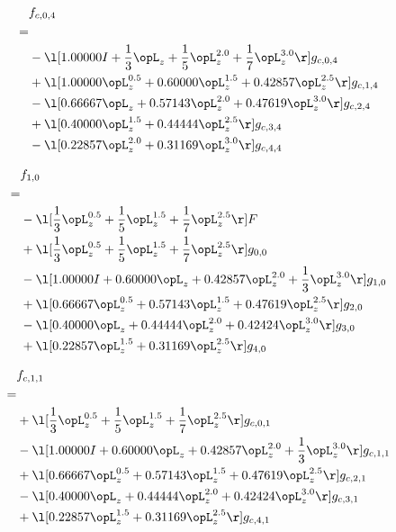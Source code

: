 \begin{alignat}{2} 
\label{eq:f_04_0} 
& f_{c,0,4} \nonumber \\ 
 = \\ 
& - \l[  1.00000 I + \frac{1}{3} \opL_z + \frac{1}{5} \opL_z^{2.0} + \frac{1}{7} \opL_z^{3.0}  \r] g_{c,0,4} \nonumber \\ 
& + \l[  1.00000 \opL_z^{0.5} +  0.60000 \opL_z^{1.5} +  0.42857 \opL_z^{2.5}  \r] g_{c,1,4} \nonumber \\ 
& - \l[  0.66667 \opL_z +  0.57143 \opL_z^{2.0} +  0.47619 \opL_z^{3.0}  \r] g_{c,2,4} \nonumber \\ 
& + \l[  0.40000 \opL_z^{1.5} +  0.44444 \opL_z^{2.5}  \r] g_{c,3,4} \nonumber \\ 
& - \l[  0.22857 \opL_z^{2.0} +  0.31169 \opL_z^{3.0}  \r] g_{c,4,4} \nonumber \\ 
\end{alignat} 


\begin{alignat}{2} 
\label{eq:f_10_0} 
& f_{1,0} \nonumber \\ 
 = \\ 
& - \l[ \frac{1}{3} \opL_z^{0.5} + \frac{1}{5} \opL_z^{1.5} + \frac{1}{7} \opL_z^{2.5}  \r] F \nonumber \\ 
& + \l[ \frac{1}{3} \opL_z^{0.5} + \frac{1}{5} \opL_z^{1.5} + \frac{1}{7} \opL_z^{2.5}  \r] g_{0,0} \nonumber \\ 
& - \l[  1.00000 I +  0.60000 \opL_z +  0.42857 \opL_z^{2.0} + \frac{1}{3} \opL_z^{3.0}  \r] g_{1,0} \nonumber \\ 
& + \l[  0.66667 \opL_z^{0.5} +  0.57143 \opL_z^{1.5} +  0.47619 \opL_z^{2.5}  \r] g_{2,0} \nonumber \\ 
& - \l[  0.40000 \opL_z +  0.44444 \opL_z^{2.0} +  0.42424 \opL_z^{3.0}  \r] g_{3,0} \nonumber \\ 
& + \l[  0.22857 \opL_z^{1.5} +  0.31169 \opL_z^{2.5}  \r] g_{4,0} \nonumber \\ 
\end{alignat} 


\begin{alignat}{2} 
\label{eq:f_11_0} 
& f_{c,1,1} \nonumber \\ 
 = \\ 
& + \l[ \frac{1}{3} \opL_z^{0.5} + \frac{1}{5} \opL_z^{1.5} + \frac{1}{7} \opL_z^{2.5}  \r] g_{c,0,1} \nonumber \\ 
& - \l[  1.00000 I +  0.60000 \opL_z +  0.42857 \opL_z^{2.0} + \frac{1}{3} \opL_z^{3.0}  \r] g_{c,1,1} \nonumber \\ 
& + \l[  0.66667 \opL_z^{0.5} +  0.57143 \opL_z^{1.5} +  0.47619 \opL_z^{2.5}  \r] g_{c,2,1} \nonumber \\ 
& - \l[  0.40000 \opL_z +  0.44444 \opL_z^{2.0} +  0.42424 \opL_z^{3.0}  \r] g_{c,3,1} \nonumber \\ 
& + \l[  0.22857 \opL_z^{1.5} +  0.31169 \opL_z^{2.5}  \r] g_{c,4,1} \nonumber \\ 
\end{alignat} 


